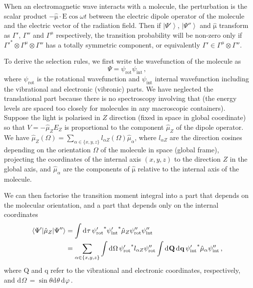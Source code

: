 \documentclass{article}
\theoremstyle{plain}\theoremheaderfont{\normalfont\itshape}\theorembodyfont{\rmfamily}\theoremseparator{.}\newtheorem*{rem}{Remark}\newtheorem*{ex}{Example}\newtheorem*{proof}{Proof}\newtheorem*{altp}{Alternative proof}
\theoremstyle{plain}\theoremheaderfont{\normalfont\bfseries}\theorembodyfont{\rmfamily}\theoremseparator{.}\newtheorem{thm}{Theorem}[section]\newtheorem{lem}[thm]{Lemma}\newtheorem{prop}[thm]{Proposition}\newtheorem*{cor}{Corollary}\newtheorem{defn}[thm]{Definition}\newtheorem{clm}[thm]{Claim}\newtheorem{clminproof}{Claim}\newtheorem*{law}{Law}\newtheorem{pos}[thm]{Postulate}
\theoremstyle{break}\theoremheaderfont{\normalfont\itshape}\theorembodyfont{\rmfamily}\theoremseparator{.\medskip}\newtheorem*{proofskip}{Proof}\newtheorem*{exs}{Examples}\newtheorem*{rems}{Remarks}
\theoremstyle{break}\theoremheaderfont{\normalfont\bfseries}\theorembodyfont{\rmfamily}\theoremseparator{.\medskip}\newtheorem{lemskip}[thm]{Lemma}\newtheorem{defnskip}[thm]{Definition}\newtheorem{propskip}[thm]{Proposition}\newtheorem{thmskip}[thm]{Theorem}
\numberwithin{equation}{section}
\newcommand{\dd}[2][]{\mathrm{d}^{#1} #2\,}
\newcommand{\ket}[1]{\left| #1 \right\rangle}
\newcommand{\mel}[3]{\left\langle #1 \middle| #2 \middle| #3 \right\rangle}
\newcommand{\vb}[1]{\bm{\mathrm{#1}}}
\newcommand{\vdot}{\,\bm{\mathrm{\cdot}}\,}
\begin{document}
    When an electromagnetic wave interacts with a molecule, the perturbation is the scalar product \(-\hat{\vb{\mu}}\vdot\vb{E}\cos\omega t\) between the electric dipole operator of the molecule and the electric vector of the radiation field. Then if \(\ket{\Psi'}\), \(\ket{\Psi''}\) and \(\hat{\vb{\mu}}\) transform as \(\Gamma'\), \(\Gamma''\) and \(\Gamma^\mu\) respectively, the transition probability will be non-zero only if \({\Gamma'}^*\otimes\Gamma^{\mu}\otimes\Gamma''\) has a totally symmetric component, or equivalently \(\Gamma'\in\Gamma^\mu\otimes\Gamma''\).

    To derive the selection rules, we first write the wavefunction of the molecule as
    \begin{equation}
        \Psi=\psi_{\text{rot}}\psi_{\text{int}}\,,
    \end{equation}
    where \(\psi_{\text{rot}}\) is the rotational wavefunction and \(\psi_{\text{int}}\) internal wavefunction including the vibrational and electronic (vibronic) parts. We have neglected the translational part because there is no spectroscopy involving that (the energy levels are spaced too closely for molecules in any macroscopic containers). Suppose the light is polarised in \(Z\) direction (fixed in space in global coordinate) so that \(V=-\hat{\mu}_ZE_Z\) is proportional to the component \(\hat{\mu}_Z\) of the dipole operator. We have \(\hat{\mu}_Z(\Omega)=\sum_{\alpha\in\{x,y,z\}}l_{\alpha Z}(\Omega)\hat{\mu}_{\alpha}\), where \(l_{\alpha Z}\) are the direction cosines depending on the orientation \(\Omega\) of the molecule in space (global frame), projecting the coordinates of the internal axis \((x,y,z)\) to the direction \(Z\) in the global axis, and \(\hat{\mu}_\alpha\) are the components of \(\hat{\vb{\mu}}\) relative to the internal axis of the molecule.

    We can then factorise the transition moment integral into a part that depends on the molecular orientation, and a part that depends only on the internal coordinates
    \begin{align}\label{transition_dipole}
        \mel{\Psi'}{\hat{\mu}_Z}{\Psi''}&=\int\dd{\tau}{\psi'_{\text{rot}}}^*{\psi'_{\text{int}}}^*\hat{\mu}_Z\psi''_{\text{rot}}\psi''_{\text{int}}\notag\\
        &=\sum_{\alpha\in\{x,y,z\}}\int\dd{\Omega}{\psi'_{\text{rot}}}^*l_{\alpha Z}\psi''_{\text{rot}}\int\dd{\vb{Q}}\dd{\vb{q}}{\psi'_{\text{int}}}^*\hat{\mu}_{\alpha}\psi_{\text{int}}''\,,
    \end{align}
    where \(\vb{Q}\) and \(\vb{q}\) refer to the vibrational and electronic coordinates, respectively, and \(\dd{\Omega}=\sin\theta\dd{\theta}\dd{\varphi}\).
\end{document}
